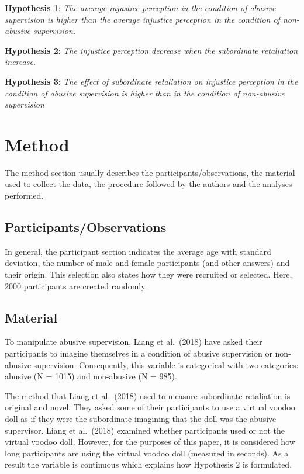 \documentclass[
]{article}
\begin{document}
\textbf{Hypothesis 1}: \emph{The average injustice perception in the
condition of abusive supervision is higher than the average injustice
perception in the condition of non-abusive supervision.}

\textbf{Hypothesis 2}: \emph{The injustice perception decrease when the
subordinate retaliation increase.}

\textbf{Hypothesis 3}: \emph{The effect of subordinate retaliation on
injustice perception in the condition of abusive supervision is higher
than in the condition of non-abusive supervision}

\hypertarget{method}{%
\section{Method}\label{method}}

The method section usually describes the participants/observations, the
material used to collect the data, the procedure followed by the authors
and the analyses performed.

\hypertarget{participantsobservations}{%
\subsection{Participants/Observations}\label{participantsobservations}}

In general, the participant section indicates the average age with
standard deviation, the number of male and female participants (and
other answers) and their origin. This selection also states how they
were recruited or selected. Here, 2000 participants are created
randomly.

\hypertarget{material}{%
\subsection{Material}\label{material}}

To manipulate abusive supervision, Liang et al.~(2018) have asked their
participants to imagine themselves in a condition of abusive supervision
or non-abusive supervision. Consequently, this variable is categorical
with two categories: abusive (N = 1015) and non-abusive (N = 985).

The method that Liang et al.~(2018) used to measure subordinate
retaliation is original and novel. They asked some of their participants
to use a virtual voodoo doll as if they were the subordinate imagining
that the doll was the abusive supervisor. Liang et al.~(2018) examined
whether participants used or not the virtual voodoo doll. However, for
the purposes of this paper, it is considered how long participants are
using the virtual voodoo doll (measured in seconds). As a result the
variable is continuous which explains how Hypothesis 2 is formulated.
\end{document}
